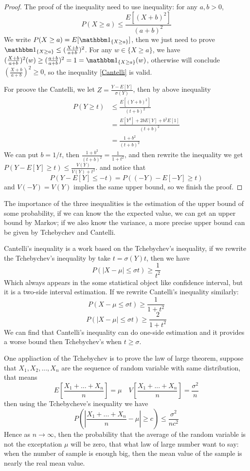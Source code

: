 \documentclass[en,geye,blue,normal,12pt,bibend=bibtex]{elegantnote}
\begin{document}
\begin{proof} 
    The proof of the inequality need to use inequality: for any \(a,b>0\), 
    \begin{equation}
        P(X \geq a) \leq \frac{E[(X+b)^2]}{(a+b)^2}\label{Cantelli}
    \end{equation}
    We write \(P(X \geq a) = E[ \cha_{\{X \geq a\}}]\), then we just need to prove \(\cha_{\{X \geq a\}} \leq (\frac{X+b}{a+b})^2\).
    For any \(w \in \{X \geq a\}\), we have \((\frac{X+b}{a+b})^2(w) \geq (\frac{a+b}{a+b})^2 = 1 =\cha_{\{X \geq a\}}(w)\), otherwise will conclude \((\frac{X+b}{a+b})^2 \geq 0\), so the inequality \ref{Cantelli} is valid.

    For proove the Cantelli, we let \(Z = \frac{Y-E[Y]}{\sigma(Y)}\), then by above inequality
    \begin{align*}
        P(Y \geq t) &\leq \frac{E[(Y+b)^2]}{(t+b)^2} \\
        &= \frac{E[Y^2]+2bE[Y]+b^2E[1]}{(t+b)^2} \\
        &= \frac{1+b^2}{(t+b)^2}
    \end{align*}
    We can put \(b = 1/t\), then \(\frac{1+b^2}{(t+b)^2} = \frac{1}{1+t^2}\), and then rewrite the inequality we get 
    \(P(Y-E[Y] \geq t) \leq \frac{V(Y)}{V(Y)+t^2}\).
    and notice that 
    \[P(Y-E[Y] \leq -t) = P((-Y)-E[-Y] \geq t)\]
    and \(V(-Y)=V(Y)\) implies the same upper bound, so we finish the proof.
\end{proof}

The importance of the three inequalities is the estimation of the upper bound of some probability, if we can know the the expected value, we can get an upper bound by Markov; if we also know the variance, a more precise upper bound can be given by Tchebychev and Cantelli.

Cantelli's inequality is a work based on the Tchebychev's inequality, if we rewrite the Tchebychev's inequality by take \(t = \sigma(Y)t\), then we have
    \[P(|X-\mu|\leq \sigma t) \geq \frac{1}{t^2} \label{eq:Tchebychev}\]
Which always appears in the some statistical object like confidence interval, but it is a two-side interval estimation. If we rewrite Cantelli's inequality similarly:
\[P(X-\mu\leq \sigma t) \geq \frac{1}{1+t^2}\]
\[P(|X-\mu|\leq \sigma t) \geq \frac{2}{1+t^2}\]
We can find that Cantelli's inequality can do one-side estimation and it provides a worse bound then Tchebychev's when \(t \geq \sigma\).

One appliaction of the Tchebychev is to prove the law of large theorem, suppose that \(X_1,X_2,...,X_n\) are the sequence of random variable with same distribution, that means 
\[E[\frac{X_1+...+X_n}{n}] = \mu \quad V[\frac{X_1+...+X_n}{n}] = \frac{\sigma^2}{n}\]
then using the Tchebycheve's inequality we have 
\[P(|\frac{X_1+...+X_n}{n}-\mu|\geq c) \leq \frac{\sigma^2}{nc^2}\]
Hence as \(n \rightarrow \infty\), then the probability that the average of the random variable is not the exceptation \(\mu\) will be zero, that what law of large number want to say: when the number of sample is enough big, then the mean value of the sample is nearly the real mean value.
\end{document}
